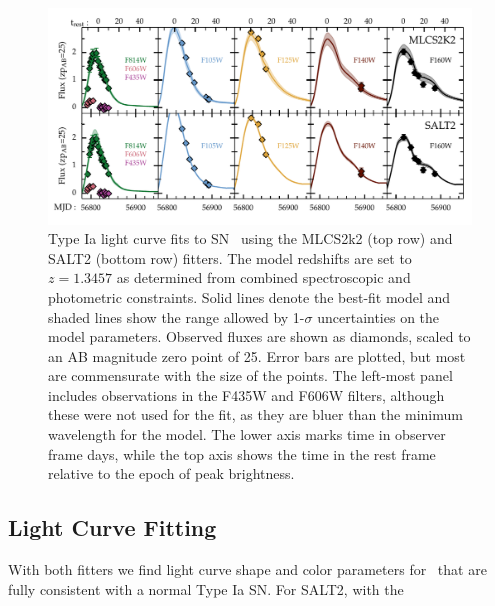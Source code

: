 \begin{figure}
\begin{center}
\includegraphics[width=\textwidth]{FIG/snTomas_lightcurve_fit_fluxAB25}
\caption{ Type Ia light curve fits to SN \tomas\ using the MLCS2k2
(top row) and SALT2 (bottom row) fitters. The model redshifts are set to
$z=1.3457$ as determined from combined
spectroscopic and photometric constraints.  Solid lines denote the
best-fit model and shaded lines show the range allowed by 1-$\sigma$
uncertainties on the model parameters. 
Observed fluxes are shown as diamonds, scaled to an AB magnitude
zero point of 25. Error bars are plotted, but most are commensurate
with the size of the points. The left-most panel includes observations
in the F435W and F606W filters, although these were not used for the
fit, as they are bluer than the minimum wavelength for the model. The
lower axis marks time in observer frame days, while the top axis shows
the time in the rest frame relative to the epoch of peak brightness.
\label{fig:LightCurveFits} }
\end{center}
\end{figure}


\subsection{Light Curve Fitting}
\label{sec:LightCurveFitting}

  With both fitters we find light curve
shape and color parameters for \tomas\ that are fully consistent with
a normal Type Ia SN.  For SALT2, with the

